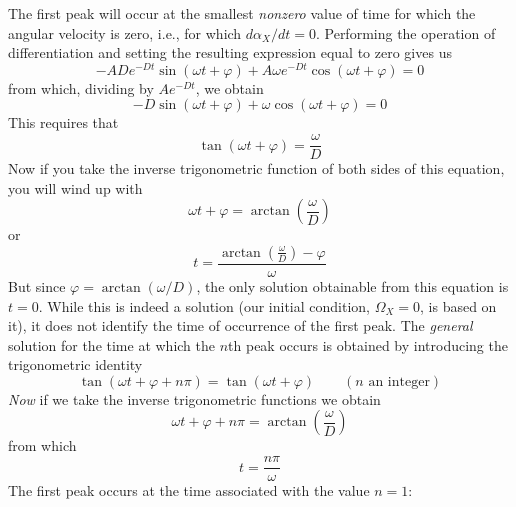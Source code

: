 The first peak will occur at the smallest \emph{nonzero} value of time for
which the angular velocity is zero, i.e., for which $d\alpha_X/dt = 0$.
Performing the operation of differentiation and setting the resulting
expression equal to zero gives us
\begin{equation*}
-AD e^{-Dt}\sin(\omega t + \varphi) + A\omega e^{-Dt}\cos(\omega t + \varphi) = 0
\end{equation*}
from which, dividing by $Ae^{-Dt}$, we obtain
\begin{equation*}
-D\sin(\omega t + \varphi) + \omega\cos(\omega t + \varphi) = 0
\end{equation*}
This requires that
\begin{equation*}
\tan(\omega t + \varphi) = \frac{\omega}{D}
\end{equation*}
Now if you take the inverse trigonometric function of both sides of this
equation, you will wind up with
\begin{equation*}
\omega t + \varphi = \arctan\left(\frac{\omega}{D}\right)
\end{equation*}
or
\begin{equation*}
t = \frac{\arctan\left(\frac{\omega}{D}\right) - \varphi}{\omega}
\end{equation*}
But since $\varphi = \arctan(\omega/D)$, the only solution obtainable from this
equation is $t = 0$. While this is indeed a solution (our initial condition,
$\Omega_X = 0$, is based on it), it does not identify the time of occurrence of
the first peak. The \emph{general} solution for the time at which the $n$th
peak occurs is obtained by introducing the trigonometric identity
\begin{equation*}
\tan(\omega t + \varphi + n\pi) = \tan(\omega t + \varphi) \qquad (n \text{ an integer})
\end{equation*}
\emph{Now} if we take the inverse trigonometric functions we obtain
\begin{equation*}
\omega t + \varphi + n\pi = \arctan\left(\frac{\omega}{D}\right)
\end{equation*}
from which
\begin{equation*}
t = \frac{n\pi}{\omega}
\end{equation*}
The first peak occurs at the time associated with the value $n = 1$:
